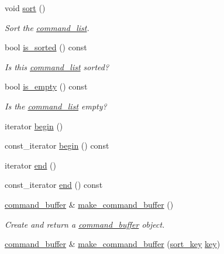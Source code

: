 \begin{DoxyCompactItemize}
void \mbox{\hyperlink{classmoka_1_1command__list_a7c4e7f6a3e3dc4debb6e81cddd34ac69}{sort}} ()
\begin{DoxyCompactList}\small\item\em Sort the \mbox{\hyperlink{classmoka_1_1command__list}{command\+\_\+list}}. \end{DoxyCompactList}\item 
bool \mbox{\hyperlink{classmoka_1_1command__list_a701506237d0c2d8287be286e8251bdfd}{is\+\_\+sorted}} () const
\begin{DoxyCompactList}\small\item\em Is this \mbox{\hyperlink{classmoka_1_1command__list}{command\+\_\+list}} sorted? \end{DoxyCompactList}\item 
bool \mbox{\hyperlink{classmoka_1_1command__list_ac024606b9c2c52bf6a882ea0d8b28022}{is\+\_\+empty}} () const
\begin{DoxyCompactList}\small\item\em Is the \mbox{\hyperlink{classmoka_1_1command__list}{command\+\_\+list}} empty? \end{DoxyCompactList}\item 
iterator \mbox{\hyperlink{classmoka_1_1command__list_ae98e0e3732a2b8a0cd0cd26f72f8a5a7}{begin}} ()
\item 
const\+\_\+iterator \mbox{\hyperlink{classmoka_1_1command__list_a8d39d8468c75189155278881bd24c756}{begin}} () const
\item 
iterator \mbox{\hyperlink{classmoka_1_1command__list_af11bbf9fce1b2ae517fe63feeb9eca75}{end}} ()
\item 
const\+\_\+iterator \mbox{\hyperlink{classmoka_1_1command__list_a69a582663d1027e600d1ca28cbe15a4d}{end}} () const
\item 
\mbox{\hyperlink{classmoka_1_1command__buffer}{command\+\_\+buffer}} \& \mbox{\hyperlink{classmoka_1_1command__list_a9aa451174a49a270c109b99360fa5924}{make\+\_\+command\+\_\+buffer}} ()
\begin{DoxyCompactList}\small\item\em Create and return a \mbox{\hyperlink{classmoka_1_1command__buffer}{command\+\_\+buffer}} object. \end{DoxyCompactList}\item 
\mbox{\hyperlink{classmoka_1_1command__buffer}{command\+\_\+buffer}} \& \mbox{\hyperlink{classmoka_1_1command__list_a5c2c6daa98bc6586ae09bc8f9c3f5ce2}{make\+\_\+command\+\_\+buffer}} (\mbox{\hyperlink{namespacemoka_afa30a616e67b83113ebdb857555cf2bb}{sort\+\_\+key}} \mbox{\hyperlink{namespacemoka_a45a36b05a9b9eddb028d6c60305ae71d}{key}})

\end{DoxyCompactItemize}
